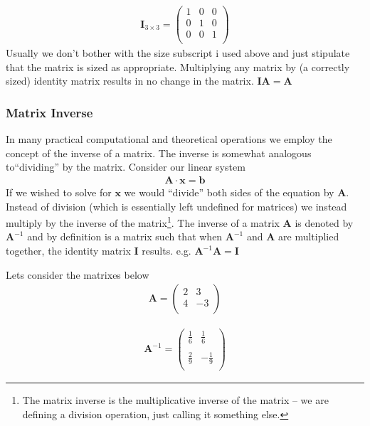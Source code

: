 \begin{gather}
\mathbf{I}_{3\times3}=
\begin{pmatrix}
1 & 0 & 0\\
0 & 1 & 0\\
0 & 0 & 1\\
\end{pmatrix}
\end{gather}
Usually we don't bother with the size subscript i used above and just stipulate that the matrix is sized as appropriate.
Multiplying any matrix by (a correctly sized) identity matrix results in no change in the matrix.  $\mathbf{I}\mathbf{A} = \mathbf{A}$  

\subsubsection{Matrix Inverse}
In many practical computational and theoretical operations we employ the concept of the inverse of a matrix.
The inverse is somewhat analogous to``dividing'' by the matrix.  
Consider our linear system 
\begin{gather}
\mathbf{A} \cdot \mathbf{x} = \mathbf{b}
\end{gather}
If we wished to solve for $\mathbf{x}$ we would ``divide'' both sides of the equation by $\mathbf{A}$.   
Instead of division (which is essentially left undefined for matrices) we instead multiply by the inverse of the matrix\footnote{The matrix inverse is the multiplicative inverse of the matrix -- we are defining a division operation, just calling it something else.}.
The inverse of a matrix $\mathbf{A}$ is denoted by $\mathbf{A}^{-1}$ and by definition is a matrix such that when $\mathbf{A}^{-1}$ and $\mathbf{A}$ are multiplied together, the identity matrix $\mathbf{I}$ results.  e.g. $\mathbf{A}^{-1} \mathbf{A} = \mathbf{I}$

Lets consider the matrixes below
\begin{gather}
\mathbf{A}=
\begin{pmatrix}
2 & 3 \\
4 & -3 \\
\end{pmatrix}
\end{gather}

\begin{gather}
\mathbf{A}^{-1}=
\begin{pmatrix}
\frac{1}{6} & \frac{1}{6} \\
~\\
\frac{2}{9} & -\frac{1}{9} \\
\end{pmatrix}
\end{gather}

